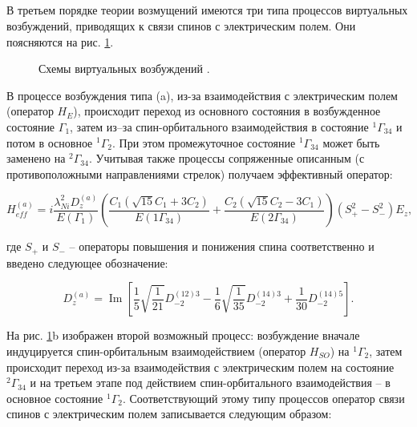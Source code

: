 \subsection{\nif}\label{subsec:ch2/sec3/sub1}

В третьем порядке теории возмущений имеются три типа процессов виртуальных возбуждений, приводящих к связи спинов с электрическим полем. Они поясняются на рис. \cref{fig:ni_trans}.

\begin{figure}[ht]
	\caption{Схемы виртуальных возбуждений \nif.}
	\label{fig:ni_trans}
\end{figure}

В процессе возбуждения типа (a), из-за взаимодействия с электрическим полем (оператор $H_{E}$), происходит переход из основного состояния в возбужденное состояние $\Gamma_{1}$, затем из–за спин-орбитального взаимодействия в состояние $^{1}\Gamma_{34}$ и потом в основное $^{1}\Gamma_{2}$. При этом промежуточное состояние  $^{1}\Gamma_{34}$ может быть заменено на $^{2}\Gamma_{34}$. Учитывая также процессы сопряженные описанным (с противоположными направлениями стрелок) получаем эффективный оператор:

\begin{equation}
	\label{eq:NiHeffA}
	H_{eff}^{(a)}=i \frac{\lambda_{Ni}^{2} D_{z}^{(a)}}{E\left(\Gamma_{1}\right)}\left(\frac{C_{1}\left(\sqrt{15} C_{1}+3 C_{2}\right)}{E\left(1 \Gamma_{34}\right)}+\frac{C_{2}\left(\sqrt{15} C_{2}-3 C_{1}\right)}{E\left(2 \Gamma_{34}\right)}\right)\left(S_{+}^{2}-S_{-}^{2}\right) E_{z},
\end{equation}

где $S_{+}$ и $S_{-}$ – операторы повышения и понижения спина соответственно и введено следующее обозначение:

\begin{equation}
	\label{eq:NiDzA}
	D_{z}^{(a)}=\operatorname{Im}\left[\frac{1}{5} \sqrt{\frac{1}{21}} D_{-2}^{(12) 3}-\frac{1}{6} \sqrt{\frac{1}{35}} D_{-2}^{(14) 3}+\frac{1}{30} D_{-2}^{(14) 5}\right].
\end{equation}

На рис. \cref{fig:ni_trans}b изображен второй возможный процесс: возбуждение вначале индуцируется спин-орбитальным взаимодействием (оператор $H_{SO}$) на $^{1}\Gamma_{2}$, затем происходит переход из-за взаимодействия с электрическим полем на состояние $^{2}\Gamma_{34}$ и на третьем этапе под действием спин-орбитального взаимодействия – в основное состояние $^{1}\Gamma_{2}$. Соответствующий этому типу процессов оператор связи спинов с электрическим полем записывается следующим образом:

